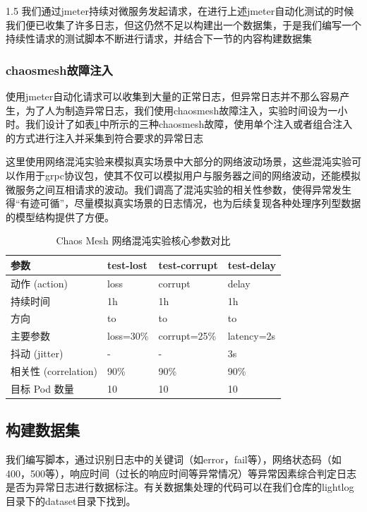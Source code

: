 \documentclass[a4paper,12pt]{report}
\begin{document}
\begin{spacing}{1.5}
我们通过jmeter持续对微服务发起请求，在进行上述jmeter自动化测试的时候我们便已收集了许多日志，但这仍然不足以构建出一个数据集，于是我们编写一个持续性请求的测试脚本不断进行请求，并结合下一节的内容构建数据集

\subsubsection{chaosmesh故障注入}

使用jmeter自动化请求可以收集到大量的正常日志，但异常日志并不那么容易产生，为了人为制造异常日志，我们使用chaosmesh故障注入，实验时间设为一小时。我们设计了如表\ref{tab:chaos-core}中所示的三种chaosmesh故障，使用单个注入或者组合注入的方式进行注入并采集到符合要求的异常日志

这里使用网络混沌实验来模拟真实场景中大部分的网络波动场景，这些混沌实验可以作用于grpc协议包，使其不仅可以模拟用户与服务器之间的网络波动，还能模拟微服务之间互相请求的波动。我们调高了混沌实验的相关性参数，使得异常发生得“有迹可循”，尽量模拟真实场景的日志情况，也为后续复现各种处理序列型数据的模型结构提供了方便。

\begin{table}[htbp]
	\centering
	\caption{Chaos Mesh 网络混沌实验核心参数对比}
	\label{tab:chaos-core}
	\begin{tabular}{|l|l|l|l|}
		\hline
		\textbf{参数} & \textbf{test-lost} & \textbf{test-corrupt} & \textbf{test-delay} \\ \hline
		动作 (action) & loss & corrupt & delay \\ \hline
		持续时间 & 1h & 1h & 1h \\ \hline
		方向 & to & to & to \\ \hline
		主要参数 & loss=30\% & corrupt=25\% & latency=2s \\ \hline
		抖动 (jitter) & - & - & 3s \\ \hline
		相关性 (correlation) & 90\% & 90\% & 90\% \\ \hline
		目标 Pod 数量 & 10 & 10 & 10 \\ \hline
	\end{tabular}
\end{table}

\subsection{构建数据集}

我们编写脚本，通过识别日志中的关键词（如error，fail等），网络状态码（如400，500等），响应时间（过长的响应时间等异常情况）等异常因素综合判定日志是否为异常日志进行数据标注。有关数据集处理的代码可以在我们仓库的lightlog目录下的dataset目录下找到。


\end{spacing}
\end{document}
